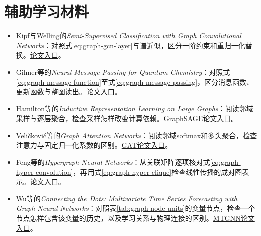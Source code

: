 \clearpage
\section*{辅助学习材料}
\begin{itemize}
 \item Kipf与Welling的\textit{Semi-Supervised Classification with Graph Convolutional Networks}：对照式\eqref{eq:graph-gcn-layer}与谱近似，区分一阶约束和重归一化替换。\href{https://arxiv.org/abs/1609.02907}{论文入口}。
 \item Gilmer等的\textit{Neural Message Passing for Quantum Chemistry}：对照式\eqref{eq:graph-message-function}\allowbreak{}至\allowbreak{}式\eqref{eq:graph-message-passing}，区分消息函数、更新函数与整图读出。\href{https://arxiv.org/abs/1704.01212}{论文入口}。
 \item Hamilton等的\textit{Inductive Representation Learning on Large Graphs}：阅读邻域采样与逐层聚合，检查采样怎样改变计算依赖。\href{https://arxiv.org/abs/1706.02216}{GraphSAGE论文入口}。
 \item Veli\v{c}kovi\'{c}等的\textit{Graph Attention Networks}：阅读邻域softmax和多头聚合，检查注意力与固定归一化系数的区别。\href{https://arxiv.org/abs/1710.10903}{GAT论文入口}。
 \item Feng等的\textit{Hypergraph Neural Networks}：从关联矩阵逐项核对式\eqref{eq:graph-hyper-convolution}，再用式\eqref{eq:graph-hyper-clique}检查线性传播的成对图表示。\href{https://arxiv.org/abs/1809.09401}{论文入口}。
 \item Wu等的\textit{Connecting the Dots: Multivariate Time Series Forecasting with Graph Neural Networks}：对照表\ref{tab:graph-node-units}的变量节点，检查一个节点怎样包含该变量的历史，以及学习关系与物理连接的区别。\href{https://arxiv.org/abs/2005.11650}{MTGNN论文入口}。
\end{itemize}
